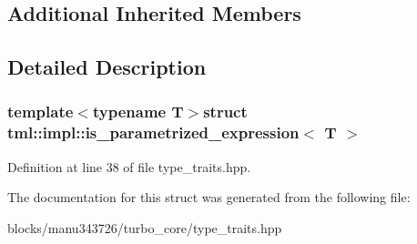 \subsection*{Additional Inherited Members}


\subsection{Detailed Description}
\subsubsection*{template$<$typename T$>$struct tml\+::impl\+::is\+\_\+parametrized\+\_\+expression$<$ T $>$}



Definition at line 38 of file type\+\_\+traits.\+hpp.



The documentation for this struct was generated from the following file\+:\begin{DoxyCompactItemize}
\item 
blocks/manu343726/turbo\+\_\+core/type\+\_\+traits.\+hpp\end{DoxyCompactItemize}
